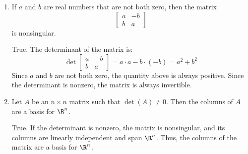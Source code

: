 \documentclass[12pt]{article}
\begin{document}
\begin{enumerate}
\item If $a$ and $b$ are real numbers that are not both zero, then the matrix
\[
\begin{bmatrix}a&-b\\b&a\end{bmatrix}
\]
is nonsingular.

True. The determinant of the matrix is:
\[
\det\begin{bmatrix}a&-b\\b&a\end{bmatrix}=a\cdot a- b\cdot(-b)=a^2+b^2
\]
Since $a$ and $b$ are not both zero, the quantity above is always positive. Since the determinant is nonzero, the matrix is always invertible.

\item Let $A$ be an $n\times n$ matrix such that $\det(A)\ne 0$. Then the columns of $A$ are a basis for $\R^n$.

True. If the determinant is nonzero, the matrix is nonsingular, and its columns are linearly independent and span $\R^n$. Thus, the columns of the matrix are a basis for $\R^n$.

\end{enumerate}
\end{document}
